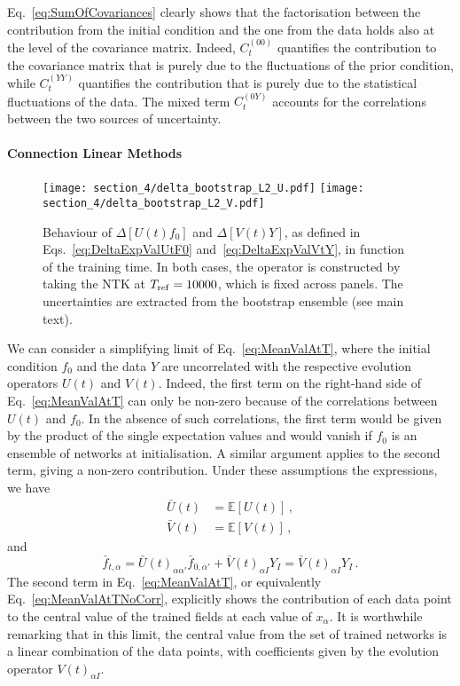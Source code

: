 Eq.~\eqref{eq:SumOfCovariances} clearly shows that the factorisation between the
contribution from the initial condition and the one from the data holds also at
the level of the covariance matrix. Indeed, $C_t^{(00)}$ quantifies the
contribution to the covariance matrix that is purely due to the fluctuations of
the prior condition, while $C_t^{(YY)}$ quantifies the contribution that is
purely due to the statistical fluctuations of the data. The mixed term
$C_t^{(0Y)}$ accounts for the correlations between the two sources of
uncertainty.


\paragraph{Connection Linear Methods}
\begin{figure}[t!]
  \centering
  \texttt{[image: section\_4/delta\_bootstrap\_L2\_U.pdf]}
  \texttt{[image: section\_4/delta\_bootstrap\_L2\_V.pdf]}
  \caption{Behaviour of $\Delta [U(t)f_0]$ and $\Delta [V(t)Y]$, as defined in
  Eqs.~\eqref{eq:DeltaExpValUtF0} and~\eqref{eq:DeltaExpValVtY}, in function of the training
  time. In both cases, the operator is constructed by taking the NTK at $T_{\rm
  ref} = 10000$, which is fixed across panels. The uncertainties are extracted
  from the bootstrap ensemble (see main text).}
    \label{fig:xT3_exp_val}
\end{figure}

We can consider a simplifying limit of Eq.~\eqref{eq:MeanValAtT}, where the
initial condition $f_0$ and the data $Y$ are uncorrelated with the respective
evolution operators $U(t)$ and $V(t)$. Indeed, the first term on the right-hand
side of Eq.~\eqref{eq:MeanValAtT} can only be non-zero because of the
correlations between $U(t)$ and $f_0$. In the absence of such correlations, the
first term would be given by the product of the single expectation values and
would vanish if $f_0$ is an ensemble of networks at initialisation. A similar
argument applies to the second term, giving a non-zero contribution. Under these
assumptions the expressions, we have
\begin{align}
    \label{eq:MeanUt}
    \bar{U}(t)
        &= \mathbb{E}\left[U(t)\right]\, , \\
    \label{eq:MeanVt}
    \bar{V}(t)
        &= \mathbb{E}\left[V(t)\right]\, ,
\end{align}
and
\begin{equation}
    \label{eq:MeanValAtTNoCorr}
    \bar{f}_{t,\alpha} = \bar{U}(t)_{\alpha\alpha'} \bar{f}_{0,\alpha'}
        + \bar{V}(t)_{\alpha I} Y_I = \bar{V}(t)_{\alpha I} Y_I \, .
\end{equation}
The second term in Eq.~\eqref{eq:MeanValAtT}, or equivalently
Eq.~\eqref{eq:MeanValAtTNoCorr}, explicitly shows the contribution of each data
point to the central value of the trained fields at each value of $x_{\alpha}$.
It is worthwhile remarking that in this limit, the central value from the set of
trained networks is a linear combination of the data points, with coefficients
given by the evolution operator $V(t)_{\alpha I}$.


